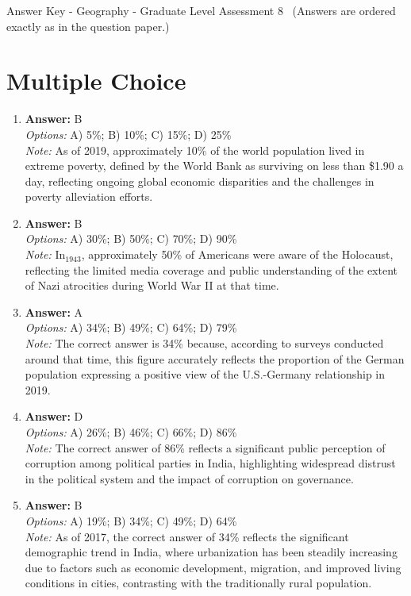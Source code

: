 \documentclass[12pt]{article}
\begin{document}
\begin{center}
Answer Key - Geography - Graduate Level Assessment 8 \
\small (Answers are ordered exactly as in the question paper.)
\end{center}

\section*{Multiple Choice}
\begin{enumerate}[label=\arabic*.]
\item \textbf{Answer:} B
\\ \textit{Options:} A) 5\%; B) 10\%; C) 15\%; D) 25\%
\\ \textit{Note:} As of 2019, approximately 10\% of the world population lived in extreme poverty, defined by the World Bank as surviving on less than \$1.90 a day, reflecting ongoing global economic disparities and the challenges in poverty alleviation efforts.
\item \textbf{Answer:} B
\\ \textit{Options:} A) 30\%; B) 50\%; C) 70\%; D) 90\%
\\ \textit{Note:} In$_{1943}$, approximately 50\% of Americans were aware of the Holocaust, reflecting the limited media coverage and public understanding of the extent of Nazi atrocities during World War II at that time.
\item \textbf{Answer:} A
\\ \textit{Options:} A) 34\%; B) 49\%; C) 64\%; D) 79\%
\\ \textit{Note:} The correct answer is 34\% because, according to surveys conducted around that time, this figure accurately reflects the proportion of the German population expressing a positive view of the U.S.-Germany relationship in 2019.
\item \textbf{Answer:} D
\\ \textit{Options:} A) 26\%; B) 46\%; C) 66\%; D) 86\%
\\ \textit{Note:} The correct answer of 86\% reflects a significant public perception of corruption among political parties in India, highlighting widespread distrust in the political system and the impact of corruption on governance.
\item \textbf{Answer:} B
\\ \textit{Options:} A) 19\%; B) 34\%; C) 49\%; D) 64\%
\\ \textit{Note:} As of 2017, the correct answer of 34\% reflects the significant demographic trend in India, where urbanization has been steadily increasing due to factors such as economic development, migration, and improved living conditions in cities, contrasting with the traditionally rural population.
\end{enumerate}
\end{document}
